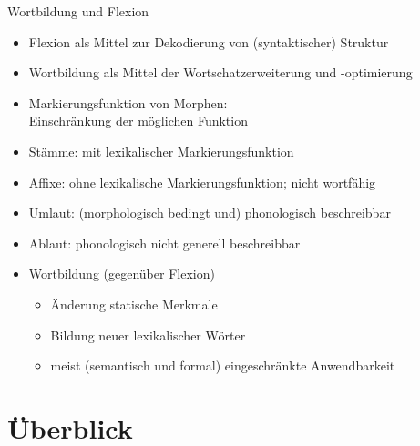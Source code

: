 \begin{frame}
  {Wortbildung und Flexion}
  \pause
  \begin{itemize}[<+->]
    \item Flexion als Mittel zur Dekodierung von (syntaktischer) Struktur
    \item Wortbildung als Mittel der Wortschatzerweiterung und -optimierung
      \Zeile
    \item Markierungsfunktion von Morphen:\\
      \alert{Einschränkung} der möglichen Funktion
    \item Stämme: mit lexikalischer Markierungsfunktion
    \item Affixe: ohne lexikalische Markierungsfunktion; nicht wortfähig
      \Zeile
    \item Umlaut: (morphologisch bedingt und) phonologisch beschreibbar
    \item Ablaut: phonologisch nicht generell beschreibbar
      \Zeile
    \item Wortbildung (gegenüber Flexion)
      \begin{itemize}
        \item Änderung statische Merkmale
        \item Bildung neuer lexikalischer Wörter
        \item meist (semantisch und formal) eingeschränkte Anwendbarkeit
      \end{itemize} 
  \end{itemize}
\end{frame}


\section{Überblick}

